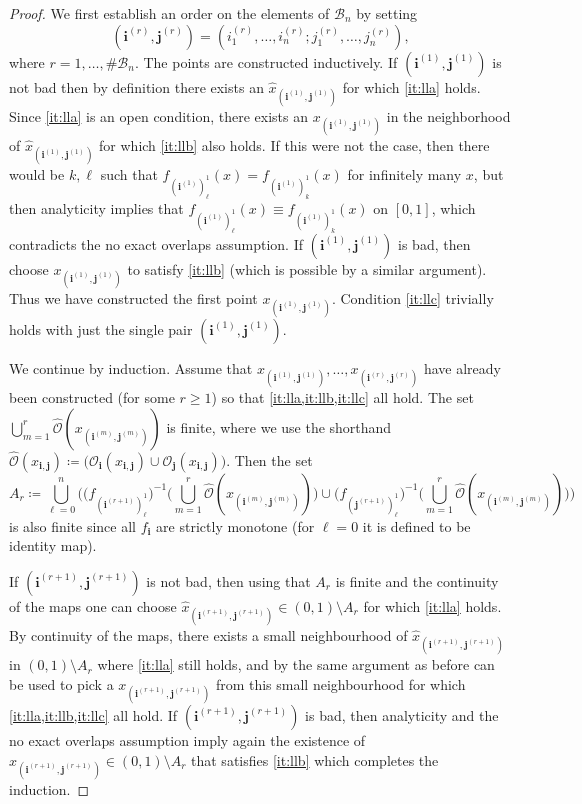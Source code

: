 \documentclass[11pt,a4paper]{article}
\def\cref#1{\ref{#1}}%
\theoremstyle{definition}
\theoremstyle{remark}
\newcommand{\0}{\mathbf{0}}
\newcommand{\bi}{\mathbf{i}}
\newcommand{\bj}{\mathbf{j}}
\numberwithin{equation}{section}
\begin{document}
\begin{proof}
We first establish an order on the elements of $\mathcal{B}_n$ by setting
\[
  (\bi^{(r)},\bj^{(r)})=(i_1^{(r)},\ldots,
i_n^{(r)};j_1^{(r)},\ldots,j_n^{(r)}),
\]
where $r=1,\ldots,\#\mathcal{B}_n$. The points are constructed
inductively. If $(\bi^{(1)},\bj^{(1)})$ is not bad then by definition there exists an $\hat
x_{(\bi^{(1)},\bj^{(1)})}$ for which \cref{it:lla} holds. Since \cref{it:lla} is an open condition, there exists an
$x_{(\bi^{(1)},\bj^{(1)})}$ in the neighborhood of $\hat x_{(\bi^{(1)},\bj^{(1)})}$ for which \cref{it:llb}
also holds. If this were not the case, then there would be $k,\ell$ such that
$f_{(\bi^{(1)})_{\ell}^1}(x)=f_{(\bi^{(1)})_{k}^1}(x)$ for infinitely many $x$, but then analyticity
implies that $f_{(\bi^{(1)})_{\ell}^1}(x)\equiv f_{(\bi^{(1)})_{k}^1}(x)$ on $[0,1]$, which contradicts the no
exact overlaps assumption. If $(\bi^{(1)},\bj^{(1)})$ is bad, then choose
$x_{(\bi^{(1)},\bj^{(1)})}$ to satisfy \cref{it:llb} (which is possible by a similar argument). Thus we have
constructed the first point $x_{(\bi^{(1)},\bj^{(1)})}$. Condition \cref{it:llc} trivially holds with just
the single pair $(\bi^{(1)},\bj^{(1)})$.

We continue by induction. Assume that $x_{(\bi^{(1)},\bj^{(1)})},\ldots,x_{(\bi^{(r)},\bj^{(r)})}$
have already been constructed (for some $r\geq 1$) so that \cref{it:lla,it:llb,it:llc} all hold. The set
$\bigcup_{m=1}^r \widehat{\mathcal{O}}(x_{(\bi^{(m)},\bj^{(m)})})$ is finite, where we use the
shorthand  $\widehat{\mathcal{O}}(x_{\bi,\bj})\coloneqq\big(\mathcal{O}_{\bi}(x_{\bi,\bj})\cup
\mathcal{O}_{\bj}(x_{\bi,\bj})\big)$. Then the set
\begin{equation*}
A_r\coloneqq \bigcup_{\ell=0}^n \bigg( \big(f_{(\bi^{(r+1)})_{\ell}^1}\big)^{-1} \Big(
\bigcup_{m=1}^r \widehat{\mathcal{O}}(x_{(\bi^{(m)},\bj^{(m)})}) \Big) \cup
\big(f_{(\bj^{(r+1)})_{\ell}^1}\big)^{-1} \Big( \bigcup_{m=1}^r
\widehat{\mathcal{O}}(x_{(\bi^{(m)},\bj^{(m)})}) \Big) \bigg)
\end{equation*}
is also finite since all $f_{\bi}$ are strictly monotone (for $\ell=0$ it is defined to be identity map).

If $(\bi^{(r+1)},\bj^{(r+1)})$ is not
bad, then using that $A_r$ is finite and the continuity of the maps one can choose $\hat
x_{(\bi^{(r+1)},\bj^{(r+1)})}\in(0,1)\setminus A_r$ for which \cref{it:lla}
holds. By continuity of the maps, there exists a small neighbourhood of $\hat
x_{(\bi^{(r+1)},\bj^{(r+1)})}$ in $(0,1)\setminus A_r$ where \cref{it:lla} still holds, and by the same
argument as before can be used to pick a $x_{(\bi^{(r+1)},\bj^{(r+1)})}$ from this small
neighbourhood for which \cref{it:lla,it:llb,it:llc} all hold. If $(\bi^{(r+1)},\bj^{(r+1)})$ is bad, then
analyticity and the no exact overlaps assumption imply again the existence of
$x_{(\bi^{(r+1)},\bj^{(r+1)})}\in(0,1)\setminus A_r$ that satisfies \cref{it:llb} which completes the
induction.
\end{proof}
\end{document}
